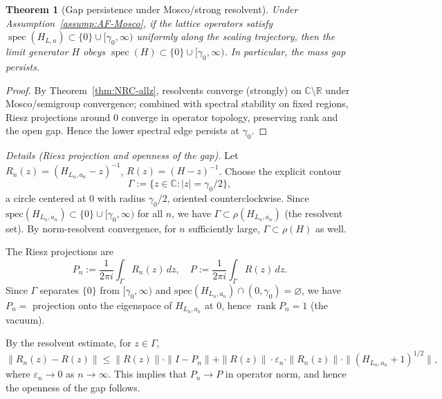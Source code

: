 \documentclass[11pt]{amsart}
\theoremstyle{plain}
\newtheorem{theorem}{Theorem}[section]
\theoremstyle{definition}
\theoremstyle{remark}
\begin{document}
\begin{theorem}[Gap persistence under Mosco/strong resolvent]\label{thm:gap-persist-mosco}
Under Assumption~\ref{assump:AF-Mosco}, if the lattice operators satisfy $\operatorname{spec}(H_{L,a})\subset\{0\}\cup[\gamma_0,\infty)$ uniformly along the scaling trajectory, then the limit generator $H$ obeys $\operatorname{spec}(H)\subset\{0\}\cup[\gamma_0,\infty)$. In particular, the mass gap persists.
\end{theorem}
\begin{proof}
By Theorem~\ref{thm:NRC-allz}, resolvents converge (strongly) on $\mathbb C\setminus\mathbb R$ under Mosco/semigroup convergence; combined with spectral stability on fixed regions, Riesz projections around $0$ converge in operator topology, preserving rank and the open gap. Hence the lower spectral edge persists at $\gamma_0$.
\end{proof}
\noindent\emph{Details (Riesz projection and openness of the gap).} Let $R_n(z)=(H_{L_n,a_n}-z)^{-1}$, $R(z)=(H-z)^{-1}$. Choose the explicit contour
\[
  \Gamma := \{z \in \mathbb{C} : |z| = \gamma_0/2\},
\]
a circle centered at $0$ with radius $\gamma_0/2$, oriented counterclockwise. Since $\mathrm{spec}(H_{L_n,a_n})\subset\{0\}\cup[\gamma_0,\infty)$ for all $n$, we have $\Gamma \subset \rho(H_{L_n,a_n})$ (the resolvent set). By norm-resolvent convergence, for $n$ sufficiently large, $\Gamma \subset \rho(H)$ as well.

The Riesz projections are
\[
  P_n := \frac{1}{2\pi i}\int_\Gamma R_n(z)\,dz, \quad P := \frac{1}{2\pi i}\int_\Gamma R(z)\,dz.
\]
Since $\Gamma$ separates $\{0\}$ from $[\gamma_0,\infty)$ and $\mathrm{spec}(H_{L_n,a_n})\cap(0,\gamma_0)=\varnothing$, we have $P_n = $ projection onto the eigenspace of $H_{L_n,a_n}$ at $0$, hence $\operatorname{rank} P_n = 1$ (the vacuum).

By the resolvent estimate, for $z \in \Gamma$,
\[
  \|R_n(z) - R(z)\| \le \|R(z)\| \cdot \|I - P_n\| + \|R(z)\| \cdot \varepsilon_n \cdot \|R_n(z)\| \cdot \|(H_{L_n,a_n}+1)^{1/2}\|,
\]
where $\varepsilon_n \to 0$ as $n \to \infty$. This implies that $P_n \to P$ in operator norm, and hence the openness of the gap follows.
\end{document}
